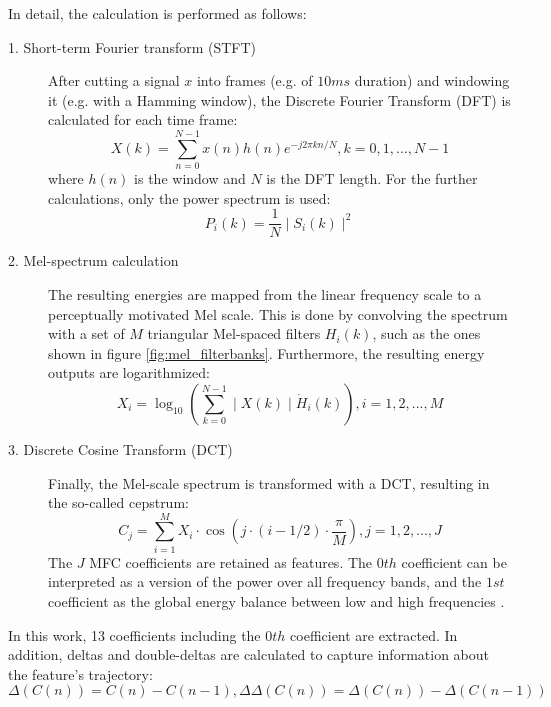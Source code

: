 In detail, the calculation is performed as follows:
\begin{description}
\item[1. Short-term Fourier transform (STFT)] After cutting a signal $x$ into frames (e.g. of $10ms$ duration) and windowing it (e.g. with a Hamming window), the Discrete Fourier Transform (DFT) is calculated for each time frame:
\begin{equation}
X(k) = \sum_{n=0}^{N-1} x(n)h(n)e^{-j 2\pi kn/N} ,  k = 0,1,...,N-1
\end{equation}
where $h(n)$ is the window and $N$ is the DFT length. For the further calculations, only the power spectrum is used:
\begin{equation}
P_i(k) = \frac{1}{N} \mid S_i(k) \mid ^2
\end{equation}

\item[2. Mel-spectrum calculation] The resulting energies are mapped from the linear frequency scale to a perceptually motivated Mel scale. This is done by convolving the spectrum with a set of $M$ triangular Mel-spaced filters $H_i(k)$, such as the ones shown in figure \ref{fig:mel_filterbanks}. Furthermore, the resulting energy outputs are logarithmized:
\begin{equation}
X_i = \log_{10} \left( \sum_{k=0}^{N-1} \mid X(k) \mid \dot H_i(k) \right), i=1,2,...,M
\end{equation}

\item[3. Discrete Cosine Transform (DCT)] Finally, the Mel-scale spectrum is transformed with a DCT, resulting in the so-called cepstrum:
\begin{equation}
C_j = \sum_{i=1}^M X_i \cdot \cos \left( j \cdot (i-1/2) \cdot \frac{\pi}{M} \right), j=1,2,...,J 
\end{equation}
The $J$ MFC coefficients are retained as features. The $0th$ coefficient can be interpreted as a version of the power over all frequency bands, and the $1st$ coefficient as the global energy balance between low and high frequencies \cite{oshaughnessy}.

\end{description}

In this work, 13 coefficients including the $0th$ coefficient are extracted. In addition, deltas and double-deltas are calculated to capture information about the feature's trajectory:
\begin{equation}
\Delta(C(n)) = C(n) - C(n-1), \Delta\Delta(C(n)) = \Delta(C(n)) - \Delta(C(n-1))
\end{equation}

